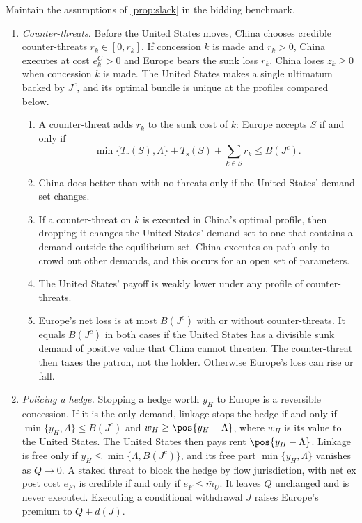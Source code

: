 \begin{proposition}\label{prop:counter}
Maintain the assumptions of \cref{prop:slack} in the bidding benchmark.
\begin{enumerate}[label=(\alph*)]
\item \emph{Counter-threats.} Before the United States moves, China chooses credible counter-threats $r_k\in[0,\bar r_k]$. If concession $k$ is made and $r_k>0$, China executes at cost $e^C_k>0$ and Europe bears the sunk loss $r_k$. China loses $z_k\ge 0$ when concession $k$ is made. The United States makes a single ultimatum backed by $J^c$, and its optimal bundle is unique at the profiles compared below.
  \begin{enumerate}[label=(\roman*)]
  \item A counter-threat adds $r_k$ to the sunk cost of $k$: Europe accepts $S$ if and only if
  \[ \min\{T_{\mathrm r}(S),\Lambda\}+T_{\mathrm s}(S)+\textstyle\sum_{k\in S}r_k\le B(J^c). \]
  \item China does better than with no threats only if the United States' demand set changes.
  \item If a counter-threat on $k$ is executed in China's optimal profile, then dropping it changes the United States' demand set to one that contains a demand outside the equilibrium set. China executes on path only to crowd out other demands, and this occurs for an open set of parameters.
  \item The United States' payoff is weakly lower under any profile of counter-threats.
  \item Europe's net loss is at most $B(J^c)$ with or without counter-threats. It equals $B(J^c)$ in both cases if the United States has a divisible sunk demand of positive value that China cannot threaten. The counter-threat then taxes the patron, not the holder. Otherwise Europe's loss can rise or fall.
  \end{enumerate}
\item \emph{Policing a hedge.} Stopping a hedge worth $y_H$ to Europe is a reversible concession. If it is the only demand, linkage stops the hedge if and only if $\min\{y_H,\Lambda\}\le B(J^c)$ and $w_H\ge\pos{y_H-\Lambda}$, where $w_H$ is its value to the United States. The United States then pays rent $\pos{y_H-\Lambda}$. Linkage is free only if $y_H\le\min\{\Lambda,B(J^c)\}$, and its free part $\min\{y_H,\Lambda\}$ vanishes as $Q\to 0$. A staked threat to block the hedge by flow jurisdiction, with net ex post cost $e_F$, is credible if and only if $e_F\le\bar m_U$. It leaves $Q$ unchanged and is never executed. Executing a conditional withdrawal $J$ raises Europe's premium to $Q+d(J)$.
\end{enumerate}
\end{proposition}

